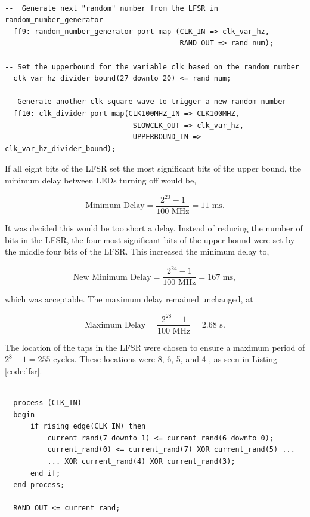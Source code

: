 \documentclass[12pt]{article}
\newenvironment{code}{\captionsetup{type=listing}}{}
\begin{document}
\begin{code}
\begin{verbatim}

--  Generate next "random" number from the LFSR in random_number_generator
  ff9: random_number_generator port map (CLK_IN => clk_var_hz,
                                         RAND_OUT => rand_num);
  
-- Set the upperbound for the variable clk based on the random number  
  clk_var_hz_divider_bound(27 downto 20) <= rand_num;

-- Generate another clk square wave to trigger a new random number
  ff10: clk_divider port map(CLK100MHZ_IN => CLK100MHZ,
                              SLOWCLK_OUT => clk_var_hz,
                              UPPERBOUND_IN => clk_var_hz_divider_bound);
\end{verbatim}
\captionsetup{belowskip=0pt}
\label{code:random_number_generation}
\end{code}

If all eight bits of the LFSR set the most significant bits of the upper bound, the minimum delay between LEDs turning off would be,

\[
\text{Minimum Delay} = \frac{2^{20} - 1}{100 \text{ MHz}} = 11 \text{ ms}.
\]

It was decided this would be too short a delay. Instead of reducing the number of bits in the LFSR, the four most significant bits of the upper bound were set by the middle four bits of the LFSR. This increased the minimum delay to,

\[
\text{New Minimum Delay} = \frac{2^{24} - 1}{100 \text{ MHz}} = 167\text{ ms},
\]

which was acceptable. The maximum delay remained unchanged, at

\[
\text{Maximum Delay} = \frac{2^{28} - 1}{100 \text{ MHz}} = 2.68 \text{ s}.
\]

The location of the taps in the LFSR were chosen to ensure a maximum period of $2^8 - 1 = 255$ cycles. These locations were 8, 6, 5, and 4 \cite{lfsr_taps}, as seen in Listing \ref{code:lfsr}.

\begin{code}
\begin{verbatim}

  process (CLK_IN)
  begin
      if rising_edge(CLK_IN) then
          current_rand(7 downto 1) <= current_rand(6 downto 0);
          current_rand(0) <= current_rand(7) XOR current_rand(5) ...
          ... XOR current_rand(4) XOR current_rand(3);
      end if;
  end process;

  RAND_OUT <= current_rand;
\end{verbatim}
\captionsetup{belowskip=0pt}
\label{code:lfsr}
\end{code}
\end{document}
